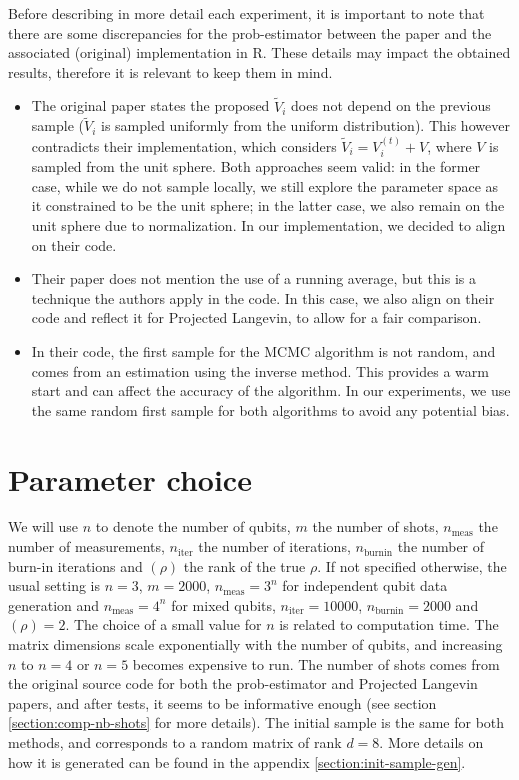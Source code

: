 \documentclass[12pt]{memoir}
\newcommand{\nmeasn}[1]{$n_{\text{meas}}=#1$}
\newcommand{\nitern}[1]{$n_{\text{iter}}=#1$}
\newcommand{\nburninn}[1]{$n_{\text{burnin}}=#1$}
\newcommand{\rhorankn}[1]{\text{rank}$(\rho)=#1$}
\newcommand{\nmeas}[0]{$n_{\text{meas}} $ }
\newcommand{\niter}[0]{$n_{\text{iter}} $ }
\newcommand{\nburnin}[0]{$n_{\text{burnin}} $ }
\newcommand{\rhorank}[0]{\text{rank}$(\rho) $ }
\begin{document}
Before describing in more detail each experiment, it is important to note that there are some discrepancies for the prob-estimator between the paper and the associated (original) implementation in R. These details may impact the obtained results, therefore it is relevant to keep them in mind.
\begin{itemize}
\item The original paper states the proposed $\tilde V_i$ does not depend on the previous sample ($\tilde V_i$ is sampled uniformly from the uniform distribution). This however contradicts their implementation, which considers $\tilde V_i = V_i^{(t)} + V$, where $V$ is sampled from the unit sphere. Both approaches seem valid: in the former case, while we do not sample locally, we still explore the parameter space as it constrained to be the unit sphere; in the latter case, we also remain on the unit sphere due to normalization. In our implementation, we decided to align on their code.
\item Their paper does not mention the use of a running average, but this is a technique the authors apply in the code. In this case, we also align on their code and reflect it for Projected Langevin, to allow for a fair comparison.
\item In their code, the first sample for the MCMC algorithm is not random, and comes from an estimation using the inverse method. This provides a warm start and can affect the accuracy of the algorithm. In our experiments, we use  the same random first sample for both algorithms to avoid any potential bias. 
\end{itemize}


\section{Parameter choice}
We will use $n$ to denote the number of qubits, $m$ the number of shots, \nmeas the number of measurements, \niter the number of iterations, \nburnin the number of burn-in iterations and \rhorank the rank of the true $\rho$. If not specified otherwise, the usual setting is $n=3$, $m=2000$, \nmeasn{3^n} for independent qubit data generation and \nmeasn{4^n} for mixed qubits, \nitern{10000}, \nburninn{2000} and \rhorankn{2}. The choice of a small value for $n$ is related to computation time. The matrix dimensions scale exponentially with the number of qubits, and increasing $n$ to $n=4$ or $n=5$ becomes expensive to run. The number of shots comes from the original source code for both the prob-estimator and Projected Langevin papers, and after tests, it seems to be informative enough (see section \ref{section:comp-nb-shots} for more details). The initial sample is the same for both methods, and corresponds to a random matrix of rank $d=8$. More details on how it is generated can be found in the appendix \ref{section:init-sample-gen}.\medbreak
\end{document}
